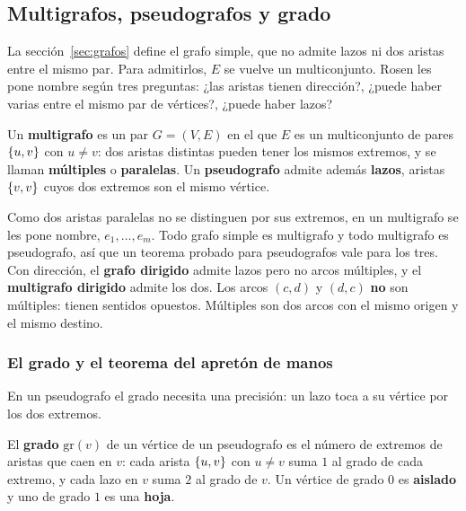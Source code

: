 \documentclass[11pt,letterpaper]{article}
\begin{document}
\subsection*{Multigrafos, pseudografos y grado}

La sección~\ref{sec:grafos} define el grafo simple, que no admite
lazos ni dos aristas entre el mismo par. Para admitirlos, $E$ se
vuelve un multiconjunto. Rosen les pone nombre según tres preguntas:
¿las aristas tienen dirección?, ¿puede haber varias entre el mismo par
de vértices?, ¿puede haber lazos?


\begin{definicion}
  \label{def:pseudografo}
  Un \textbf{multigrafo} es un par $G = (V, E)$ en el que $E$ es un
  multiconjunto de pares $\left\{ u, v \right\}$ con $u \neq v$: dos aristas
  distintas pueden tener los mismos extremos, y se llaman
  \textbf{múltiples} o \textbf{paralelas}. Un \textbf{pseudografo}
  admite además \textbf{lazos}, aristas $\left\{ v, v \right\}$ cuyos dos extremos
  son el mismo vértice.
\end{definicion}

Como dos aristas paralelas no se distinguen por sus extremos, en un
multigrafo se les pone nombre, $e_1, \dots, e_m$. Todo grafo simple es
multigrafo y todo multigrafo es pseudografo, así que un teorema
probado para pseudografos vale para los tres. Con dirección, el
\textbf{grafo dirigido} admite lazos pero no arcos múltiples, y el
\textbf{multigrafo dirigido} admite los dos. Los arcos $(c, d)$ y
$(d, c)$ \textbf{no} son múltiples: tienen sentidos opuestos.
Múltiples son dos arcos con el mismo origen y el mismo destino.

\subsubsection*{El grado y el teorema del apretón de manos}

En un pseudografo el grado necesita una precisión: un lazo toca a su
vértice por los dos extremos.

\begin{definicion}[Grado]
  \label{def:grado-lazos}
  El \textbf{grado} $\text{gr}(v)$ de un vértice de un pseudografo es
  el número de extremos de aristas que caen en $v$: cada arista
  $\left\{ u, v \right\}$ con $u \neq v$ suma $1$ al grado de cada extremo, y cada
  lazo en $v$ suma $2$ al grado de $v$. Un vértice de grado $0$ es
  \textbf{aislado} y uno de grado $1$ es una \textbf{hoja}.
\end{definicion}
\end{document}
